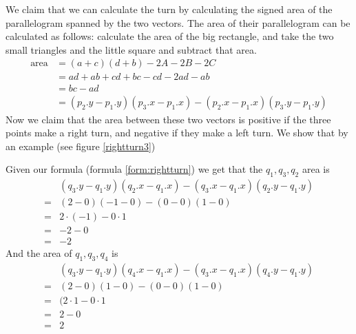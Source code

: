 We claim that we can calculate the turn by calculating the signed area of the
parallelogram spanned by the two vectors. The area of their parallelogram can
be calculated as follows: calculate the area of the big rectangle, and take the
two small triangles and the little square and subtract that area.
\begin{align}
	\text{area} &= (a+c)(d+b)-2A-2B-2C\nonumber\\
							&=ad+ab+cd+bc-cd-2ad-ab\nonumber\\
							&=bc-ad \nonumber\\
							&=(p_2.y-p_1.y)(p_3.x-p_1.x)-(p_2.x-p_1.x)(p_3.y-p_1.y)\label{form:rightturn}
\end{align}
Now we claim that the area between these two vectors is positive if the
three points make a right turn, and negative if they make a left turn. We show
that by an example (see figure \ref{rightturn3})

Given our formula (formula \ref{form:rightturn}) we get that the $q_1,q_3,q_2$ area is
\begin{align*}
	&(q_3.y-q_1.y)(q_2.x-q_1.x)-(q_3.x-q_1.x)(q_2.y-q_1.y)\\ 
	= &(2-0)(-1-0)-(0-0)(1-0)\\
	= & 2\cdot (-1)-0\cdot1\\
	= & -2-0\\
	= & -2
\end{align*}
And the area of $q_1,q_3,q_4$ is
\begin{align*}
	&(q_3.y-q_1.y)(q_4.x-q_1.x)-(q_3.x-q_1.x)(q_4.y-q_1.y)\\ 
	= &(2-0)(1-0)-(0-0)(1-0)\\
	= &(2\cdot 1 - 0\cdot 1\\
	= &2-0\\
	= &2
\end{align*}

